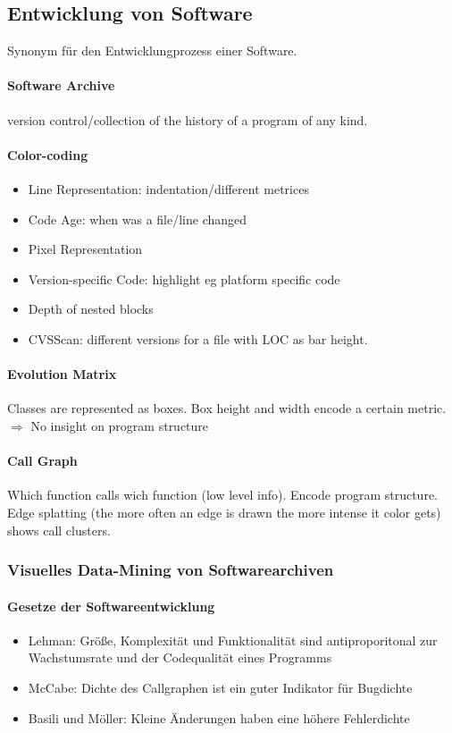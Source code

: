 \documentclass[ngerman]{scrartcl}
\begin{document}
\subsection{Entwicklung von Software}
Synonym für den Entwicklungprozess einer Software.

\paragraph{Software Archive} version control/collection of the history of a program of any kind. 

\paragraph{Color-coding}
\begin{itemize}
  \item Line Representation: indentation/different metrices
  \item Code Age: when was a file/line changed
  \item Pixel Representation
  \item Version-specific Code: highlight eg platform specific code
  \item Depth of nested blocks
  \item CVSScan: different versions for a file with LOC as bar height.
\end{itemize}

\paragraph{Evolution Matrix} Classes are represented as boxes. Box height and width encode a certain metric. $ \Rightarrow $ No insight on program structure

\paragraph{Call Graph} Which function calls wich function (low level info). Encode program structure. Edge splatting (the more often an edge is drawn the more intense it color gets) shows call clusters.


\subsubsection{Visuelles Data-Mining von Softwarearchiven}

\paragraph{Gesetze der Softwareentwicklung}
\begin{itemize}
  \item Lehman: Größe, Komplexität und Funktionalität sind antiproporitonal zur Wachstumsrate und der Codequalität eines Programms
  \item McCabe: Dichte des Callgraphen ist ein guter Indikator für Bugdichte
  \item Basili und Möller: Kleine Änderungen haben eine höhere Fehlerdichte
\end{itemize}
\end{document}
